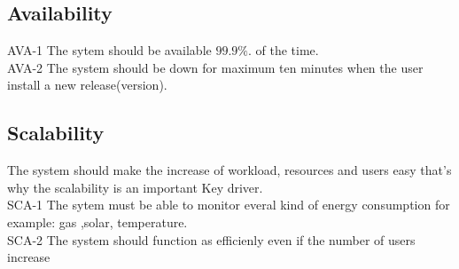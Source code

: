 \subsection{Availability}

AVA-1 The sytem should be available $99.9\%$. of the time. \\



AVA-2 The system should be down for maximum ten minutes when the user install a new release(version). \\

\subsection{Scalability} 

The system should make the increase of workload, resources and users easy that's why the scalability is an important Key driver.\\
SCA-1 The sytem must be able to monitor everal kind of energy consumption for example: gas ,solar, temperature. \\ %
SCA-2 The system should function as efficienly even if the number of users increase \\%
